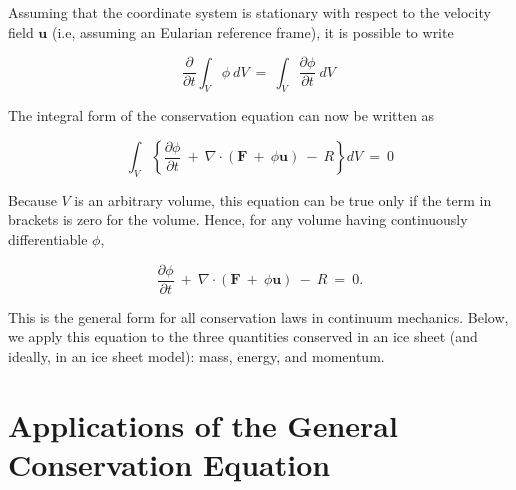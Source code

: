 \noindent
Assuming that the coordinate system is stationary with respect to the velocity field $\mathbf{u}$ 
(i.e, assuming an Eularian reference frame), it is possible to write

\begin{equation}
{\frac{ \partial}{ \partial t}} { \int }_{ V} \phi ~dV~ = ~{ \int }_{ V}
    {\frac{ \partial \phi }{ \partial t}} ~dV~
\end{equation}

\noindent
The integral form of the conservation equation can now be written as

\begin{equation}
{ \int }_{ V} \left\{ {{\frac{ \partial \phi }{ \partial t}}
    ~ + ~ \nabla {\cdot} \left ( { {\mathbf F}~ + ~ \phi {\mathbf u}} \right ) ~
    - ~ R} \right\} dV~ = ~ 0
\end{equation}

\noindent
Because $V$ is an arbitrary volume, this equation can be true only if the term in brackets is zero 
for the volume. Hence, for any volume having continuously differentiable $\phi$,

\begin{equation}
{\frac{ \partial \phi }{ \partial t}} ~ + ~ \nabla {\cdot} 
    \left ( { {\mathbf F}~ + ~ \phi {\mathbf u}} \right ) ~ - ~R~ = ~ 0.
    \label{eq:derivcons}
\end{equation}

This is the general form for all conservation laws in continuum mechanics. Below, we apply this equation
to the three quantities conserved in an 
ice sheet (and ideally, in an ice sheet model): mass, energy, and momentum.

\section{Applications of the General Conservation Equation}








